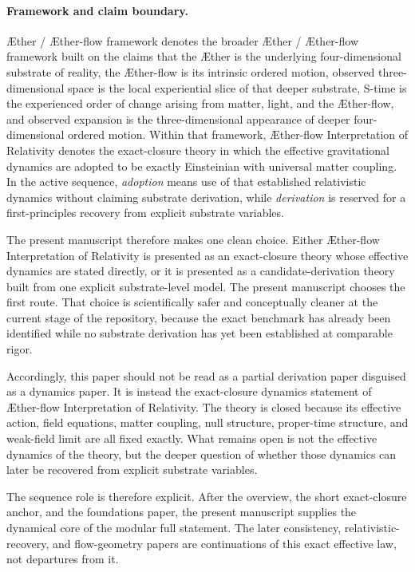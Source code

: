 \documentclass[11pt]{article}
\newcommand{\Aether}{\AE{}ther}
\newcommand{\Aflow}{\AE{}ther-flow}
\newcommand{\TheoryName}{\Aflow{} Interpretation of Relativity}
\newcommand{\TheoryProgram}{\Aether{} / \Aflow{} framework}
\begin{document}
\paragraph{Framework and claim boundary.}
\TheoryProgram{} denotes the broader \Aether{} / \Aflow{} framework built on the claims that the \Aether{} is the underlying four-dimensional substrate of reality, the \Aflow{} is its intrinsic ordered motion, observed three-dimensional space is the local experiential slice of that deeper substrate, S-time is the experienced order of change arising from matter, light, and the \Aflow{}, and observed expansion is the three-dimensional appearance of deeper four-dimensional ordered motion. Within that framework, \TheoryName{} denotes the exact-closure theory in which the effective gravitational dynamics are adopted to be exactly Einsteinian with universal matter coupling. In the active sequence, \emph{adoption} means use of that established relativistic dynamics without claiming substrate derivation, while \emph{derivation} is reserved for a first-principles recovery from explicit substrate variables.

The present manuscript therefore makes one clean choice. Either \TheoryName{} is presented as an exact-closure theory whose effective dynamics are stated directly, or it is presented as a candidate-derivation theory built from one explicit substrate-level model. The present manuscript chooses the first route. That choice is scientifically safer and conceptually cleaner at the current stage of the repository, because the exact benchmark has already been identified while no substrate derivation has yet been established at comparable rigor.

Accordingly, this paper should not be read as a partial derivation paper disguised as a dynamics paper. It is instead the exact-closure dynamics statement of \TheoryName{}. The theory is closed because its effective action, field equations, matter coupling, null structure, proper-time structure, and weak-field limit are all fixed exactly. What remains open is not the effective dynamics of the theory, but the deeper question of whether those dynamics can later be recovered from explicit substrate variables.

The sequence role is therefore explicit. After the overview, the short exact-closure anchor, and the foundations paper, the present manuscript supplies the dynamical core of the modular full statement. The later consistency, relativistic-recovery, and flow-geometry papers are continuations of this exact effective law, not departures from it.
\end{document}
